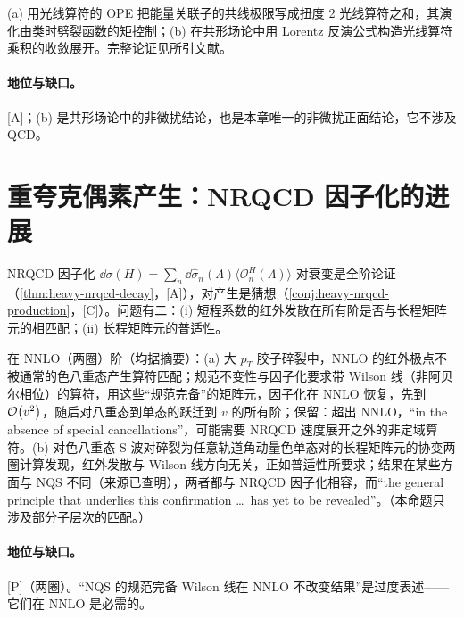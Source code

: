 \begin{proofsketch}
(a) 用光线算符的 OPE 把能量关联子的共线极限写成扭度 2 光线算符之和，其演化由类时劈裂函数的矩控制；(b) 在共形场论中用 Lorentz 反演公式构造光线算符乘积的收敛展开。完整论证见所引文献。
\end{proofsketch}

\paragraph{地位与缺口。}[A]；(b) 是共形场论中的非微扰结论，也是本章唯一的非微扰正面结论，它不涉及 QCD。

\section{重夸克偶素产生：NRQCD 因子化的进展}\label{sec:front-quarkonium}

NRQCD 因子化\cite{BodwinBraatenLepage1995} $\dd\sigma(H)=\sum_n\dd\hat\sigma_n(\Lambda)\langle\mathcal O^H_n(\Lambda)\rangle$ 对衰变是全阶论证（\cref{thm:heavy-nrqcd-decay}，[A]），对产生是猜想（\cref{conj:heavy-nrqcd-production}，[C]）。问题有二：(i) 短程系数的红外发散在所有阶是否与长程矩阵元的相匹配；(ii) 长程矩阵元的普适性。

\begin{proposition}\label{prop:front-nrqcd-ir}
在 NNLO（两圈）阶（均据摘要）：(a) 大 $p_T$ 胶子碎裂中，NNLO 的红外极点不被通常的色八重态产生算符匹配；规范不变性与因子化要求带 Wilson 线（非阿贝尔相位）的算符，用这些“规范完备”的矩阵元，因子化在 NNLO 恢复，先到 $\mathcal{O}\!\left(v^2\right)$，随后对八重态到单态的跃迁到 $v$ 的所有阶\cite{NayakQiuSterman2005a,NayakQiuSterman2005b,NayakQiuSterman2006}；保留：超出 NNLO，“in the absence of special cancellations”，可能需要 NRQCD 速度展开之外的非定域算符。(b) 对色八重态 S 波对碎裂为任意轨道角动量色单态对的长程矩阵元的协变两圈计算发现，红外发散与 Wilson 线方向无关，正如普适性所要求；结果在某些方面与 NQS 不同（来源已查明），两者都与 NRQCD 因子化相容，而“the general principle that underlies this confirmation \dots\ has yet to be revealed”\cite{Bodwin:2019bpf}。（本命题只涉及部分子层次的匹配。）
\end{proposition}

\paragraph{地位与缺口。}[P]（两圈）。“NQS 的规范完备 Wilson 线在 NNLO 不改变结果”是过度表述——它们在 NNLO 是必需的。

